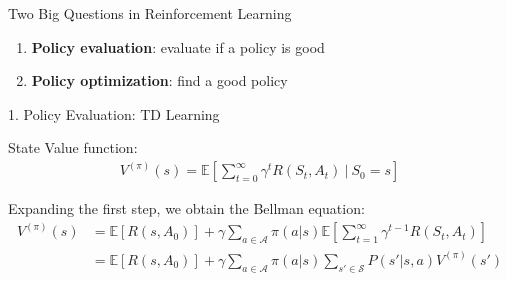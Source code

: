 \documentclass[12pt,aspectratio=169]{beamer}
\begin{document}
\begin{frame}[t]{Two Big Questions in Reinforcement Learning}
  \begin{enumerate}
  \item \textbf{\textcolor{amaranth}{Policy evaluation}}: evaluate if a policy is good

    \vspace{1em}
    
 
  \item \textbf{\textcolor{amaranth}{Policy optimization}}: find a good policy

    \vspace{1em}
    
  \end{enumerate}
  
\end{frame}

\begin{frame}{1. Policy Evaluation: TD Learning}

  \pause
  
  State Value function:
  \begin{align*}
    \nonumber 
    V^{(\pi)}(s) = \mathbb{E}\left[
    \sum_{t=0}^\infty \gamma^t R(S_{t},A_{t})
    ~\bigg|~ {S_{0}=s}
    \right]
  \end{align*}


  \pause

  Expanding the first step, we obtain the Bellman equation:
  \begin{align*}
    V^{(\pi)}(s)
    & =
    \mathbb{E}[ R(s, A_0) ]
    +
    \gamma
    \sum_{a \in \mathcal{A}}
    \pi(a | s)
    \mathbb{E} \left[
    \sum_{t=1}^\infty  \gamma^{t-1} R(S_t, A_t)
    \right]
    \\
    & = 
    \mathbb{E}[ R(s, A_0) ]
      +
    \gamma
    \sum_{a \in \mathcal{A}}
      \pi(a | s)
      \sum_{s' \in \mathcal{S}}
      P(s' | s, a)
      V^{(\pi)}(s')
  \end{align*}

\end{frame}
\end{document}
